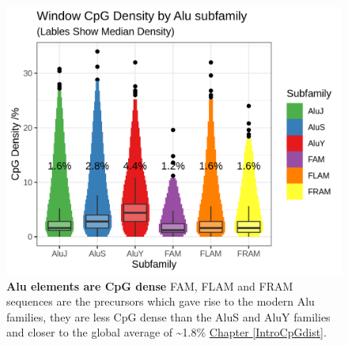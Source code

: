 \documentclass[
]{book}
\begin{document}
\begin{figure}

{\centering \includegraphics[width=0.8\linewidth]{./figs/AlusWindowsCpGdLVplot-FAMs} 

}

\caption{\textbf{Alu elements are CpG dense} FAM, FLAM and FRAM sequences are the precursors which gave rise to the modern Alu families, they are less CpG dense than the AluS and AluY families and closer to the global average of \textasciitilde1.8\% \protect\hyperlink{IntroCpGdist}{Chapter \ref{IntroCpGdist}}.}\label{fig:AlusWindowsCpGdLVplot}
\end{figure}
\end{document}
